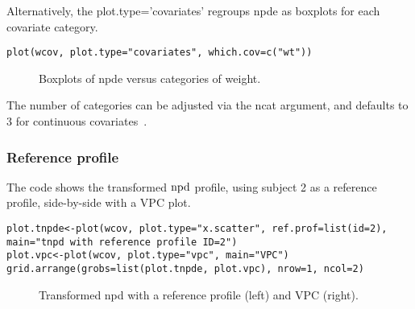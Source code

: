 Alternatively, the {\sf plot.type='covariates'} regroups npde as boxplots for each covariate category.
\begin{verbatim}
plot(wcov, plot.type="covariates", which.cov=c("wt"))
\end{verbatim} 

\begin{figure}[!h]
\par\kern -0.2cm
\begin{center}
\end{center}
\caption{Boxplots of npde versus categories of weight.}\label{fig:warfBoxCov}
\end{figure}

The number of categories can be adjusted via the {\sf ncat} argument, and defaults to 3 for continuous covariates~\cite{Brendel10}.


\subsubsection{Reference profile}

The code shows the transformed ${\rm npd}$ profile, using subject 2 as a reference profile, side-by-side with a VPC plot.

\begin{verbatim}
plot.tnpde<-plot(wcov, plot.type="x.scatter", ref.prof=list(id=2), 
main="tnpd with reference profile ID=2")
plot.vpc<-plot(wcov, plot.type="vpc", main="VPC")
grid.arrange(grobs=list(plot.tnpde, plot.vpc), nrow=1, ncol=2)
\end{verbatim}

\begin{figure}[!h]
\par\kern -0.2cm
\begin{center}
\end{center}
\caption{Transformed npd with a reference profile (left) and VPC (right).}\label{fig:refprofile}
\end{figure}




